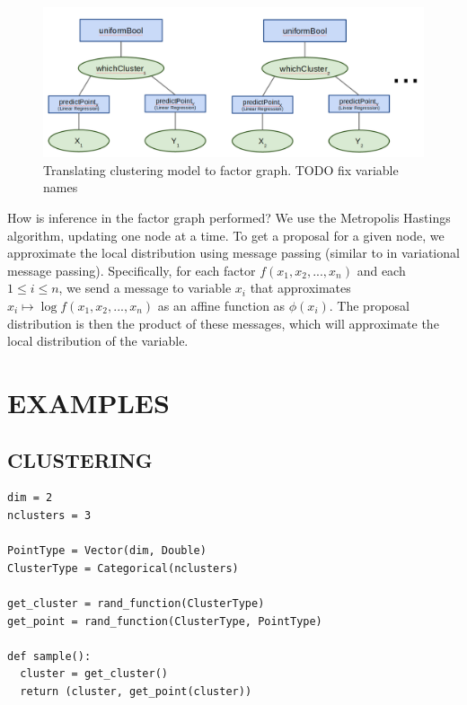 \documentclass[proceed]{article}
\begin{document}
    \begin{figure}[h]
    \begin{center}
    \includegraphics[scale=0.2]{cluster_diagram.png}
    \end{center}
    \caption{Translating clustering model to factor graph.  TODO fix variable names} 
    \end{figure} 

    How is inference in the factor graph performed?  We use the Metropolis Hastings
    algorithm, updating one node at a time.  To get a proposal for a given node,
    we approximate the local distribution using message passing (similar to
    in variational message passing).  Specifically, for each factor
    $f(x_1, x_2, ..., x_n)$ and each $1 \leq i \leq n$, we send a message
    to variable $x_i$ that approximates $x_i \mapsto \log f(x_1, x_2, ..., x_n)$ as
    an affine function as $\phi(x_i)$.  The proposal distribution is then the
    product of these messages, which will approximate the local distribution of
    the variable.



  \section{EXAMPLES}

  \subsection{CLUSTERING}
{\small
\begin{verbatim}
dim = 2
nclusters = 3

PointType = Vector(dim, Double)
ClusterType = Categorical(nclusters)

get_cluster = rand_function(ClusterType)
get_point = rand_function(ClusterType, PointType)

def sample():
  cluster = get_cluster()
  return (cluster, get_point(cluster))
\end{verbatim}
}
\end{document}
